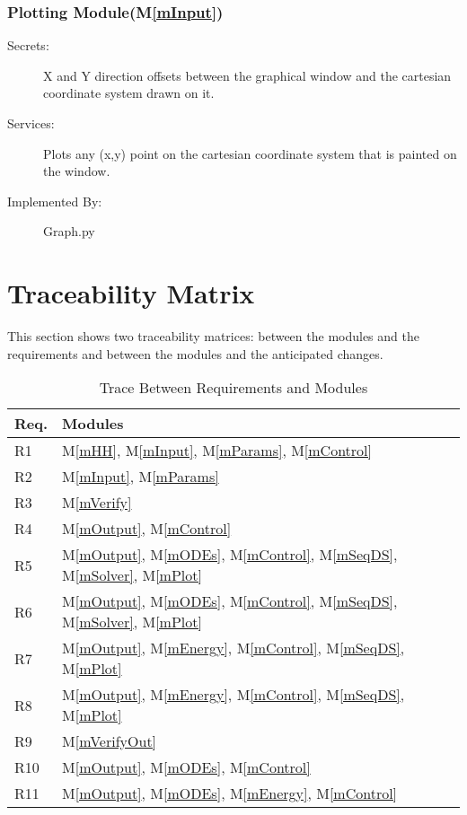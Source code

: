 \documentclass[12pt, titlepage]{article}
\newcommand{\mref}[1]{M\ref{#1}}
\begin{document}
\subsubsection{Plotting Module(\mref{mInput})}
\begin{description}
\item[Secrets:] X and Y direction offsets between the graphical window and the cartesian coordinate system drawn on it.
\item[Services:]Plots any (x,y) point on the cartesian coordinate system that is painted on the window. 
\item[Implemented By:] Graph.py
\end{description}

\section{Traceability Matrix} \label{SecTM}

This section shows two traceability matrices: between the modules and the
requirements and between the modules and the anticipated changes.

\begin{table}[H]
\centering
\begin{tabular}{p{} p{}}
\toprule
\textbf{Req.} & \textbf{Modules}\\
\midrule
R1 & \mref{mHH}, \mref{mInput}, \mref{mParams}, \mref{mControl}\\
R2 & \mref{mInput}, \mref{mParams}\\
R3 & \mref{mVerify}\\
R4 & \mref{mOutput}, \mref{mControl}\\
R5 & \mref{mOutput}, \mref{mODEs}, \mref{mControl}, \mref{mSeqDS}, \mref{mSolver}, \mref{mPlot}\\
R6 & \mref{mOutput}, \mref{mODEs}, \mref{mControl}, \mref{mSeqDS}, \mref{mSolver}, \mref{mPlot}\\
R7 & \mref{mOutput}, \mref{mEnergy}, \mref{mControl}, \mref{mSeqDS}, \mref{mPlot}\\
R8 & \mref{mOutput}, \mref{mEnergy}, \mref{mControl}, \mref{mSeqDS}, \mref{mPlot}\\
R9 & \mref{mVerifyOut}\\
R10 & \mref{mOutput}, \mref{mODEs}, \mref{mControl}\\
R11 & \mref{mOutput}, \mref{mODEs}, \mref{mEnergy}, \mref{mControl}\\
\bottomrule
\end{tabular}
\caption{Trace Between Requirements and Modules}
\label{TblRT}
\end{table}
\end{document}
